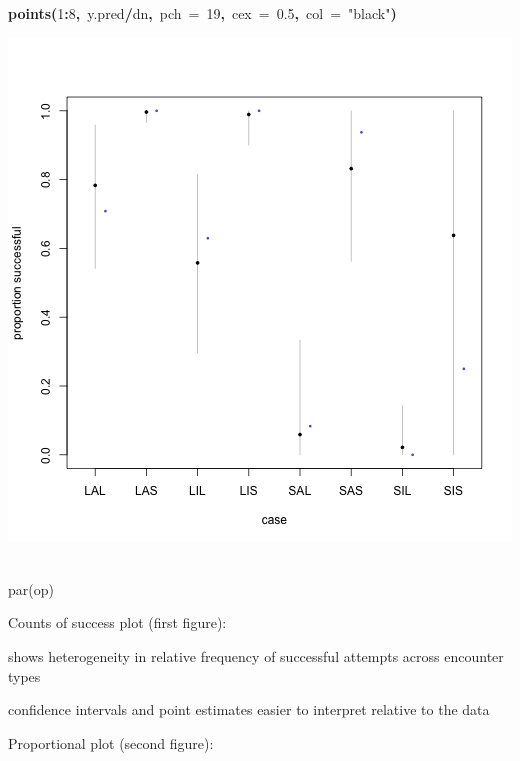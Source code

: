 \documentclass{article}
\makeatletter
\newcommand{\hlnumber}[1]{\textcolor[rgb]{0,0,0}{#1}}%
\newcommand{\hlfunctioncall}[1]{\textcolor[rgb]{.5,0,.33}{\textbf{#1}}}%
\newcommand{\hlstring}[1]{\textcolor[rgb]{.6,.6,1}{#1}}%
\newcommand{\hlkeyword}[1]{\textbf{#1}}%
\newcommand{\hlargument}[1]{\textcolor[rgb]{.69,.25,.02}{#1}}%
\newcommand{\hlcomment}[1]{\textcolor[rgb]{.18,.6,.34}{#1}}%
\newcommand{\hlsymbol}[1]{#1}%
\newcommand{\hlstd}[1]{\textcolor[rgb]{0,0,0}{#1}}%
\newenvironment{kframe}{%
 \def\FrameCommand##1{\hskip\@totalleftmargin \hskip-\fboxsep
 \colorbox{shadecolor}{##1}\hskip-\fboxsep
     \hskip-\linewidth \hskip-\@totalleftmargin \hskip\columnwidth}%
 \MakeFramed {\advance\hsize-\width
   \@totalleftmargin\z@ \linewidth\hsize
   \@setminipage}}%
 {\par\unskip\endMakeFramed}
\newenvironment{knitrout}{}{} %
\makeatother
\begin{document}
\begin{knitrout}
{\begin{kframe}
\begin{flushleft}
\hlstd{}\hlfunctioncall{points}\hlkeyword{(}\hlnumber{1}\hlkeyword{:}\hlnumber{8}\hlkeyword{,}{\ }\hlsymbol{y.pred}\hlkeyword{/}\hlsymbol{d}\hlkeyword{\usebox{\hlnormalsizeboxdollar}}\hlsymbol{n}\hlkeyword{,}{\ }\hlargument{pch}{\ }\hlargument{=}{\ }\hlnumber{19}\hlkeyword{,}{\ }\hlargument{cex}{\ }\hlargument{=}{\ }\hlnumber{0.5}\hlkeyword{,}{\ }\hlargument{col}{\ }\hlargument{=}{\ }\hlstring{"black"}\hlkeyword{)}\mbox{}
\normalfont
\end{flushleft}
\includegraphics{pirate-plot-b12} \begin{flushleft}
\ttfamily\noindent
\hspace*{\fill}\\
\hlstd{}\hlcomment{\usebox{\hlnormalsizeboxhash}par(op)}\mbox{}
\normalfont
\end{flushleft}
\end{kframe}}
\end{knitrout}


Counts of success plot (first figure):

shows heterogeneity in relative frequency of successful attempts across encounter types

confidence intervals and point estimates easier to interpret relative to the data

Proportional plot (second figure): 
\end{document}
